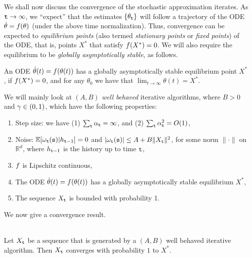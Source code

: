 We shall now discuss the convergence of the stochastic approximation iterates.  As ${\tt t}\to\infty$, we ``expect'' that the estimates
$\{\theta_{\tt t}\}$ will follow a trajectory of the ODE $\dot\theta=f(\theta)$
(under the above time normalization). Thus, convergence can be expected to \textit{equilibrium points} (also termed \textit{stationary points} or \textit{fixed points}) of the ODE, that is, points $X^*$ that satisfy 
$f(X^*) = 0$. We will also require the equilibrium to be {\em globally asymptotically stable}, as follows.
\begin{definition}
An ODE $\dot \theta(t) = f(\theta(t))$ has a globally asymptotically stable equilibrium point $X^*$, if $f(X^*) = 0$, and
for any $\theta_0$ we have that $\lim_{t \to \infty} \theta(t) = X^*$.
\end{definition}

We will mainly look at {\em $(A,B)$ well behaved} iterative
algorithms, where $B>0$ and $\gamma\in(0,1)$, which have the
following properties:
\begin{enumerate}
\item Step size: we have (1) $\sum_{\tt t}
\alpha_{\tt t}
=\infty $, and (2)
$\sum_{\tt t} \alpha_{\tt t}^2=O(1)$,
\item Noise: $\mathbb{E}[\omega_{\tt t}({\tt s})|h_{{\tt t}-1}]=0$ and $|\omega_{\tt t}({\tt s})|\leq A + B\| X_{\tt t}\|^2$, for some norm $\| \cdot \|$ on $\mathbb{R}^d$, where
$h_{{\tt t}-1}$ is the history up to time ${\tt t}$,
\item $f$ is Lipschitz continuous,
\item The ODE $\dot \theta(t) = f(\theta(t))$ has a globally asymptotically stable equilibrium $X^*$,
\item The sequence $X_{\tt t}$ is bounded with probability 1.
\end{enumerate}
We now give a convergence result.

\begin{theorem}\ \\
\label{thm:stoch-approx-ODE}
 Let $X_{\tt t}$ be a sequence that is generated by a
$(A,B)$ well behaved iterative algorithm. Then $X_{\tt t}$
converges with probability $1$ to $X^*$.
\end{theorem}



